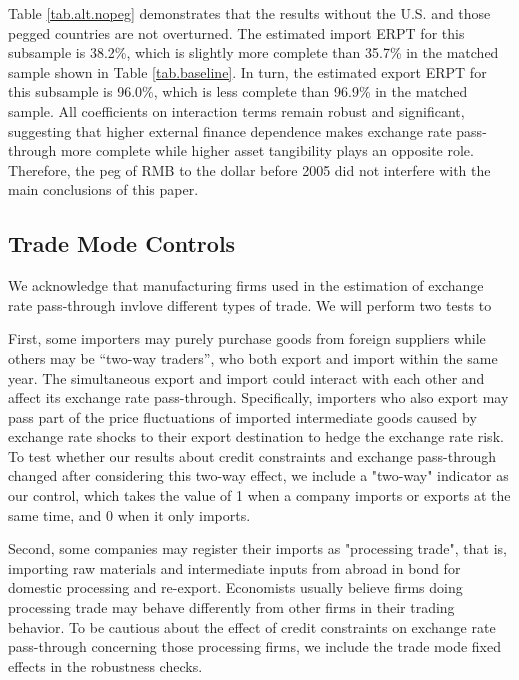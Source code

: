 \documentclass[12pt]{article}
\begin{document}
Table \ref{tab.alt.nopeg} demonstrates that the results without the U.S. and those pegged countries are not overturned. The estimated import ERPT for this subsample is 38.2\%, which is slightly more complete than 35.7\% in the matched sample shown in Table \ref{tab.baseline}. In turn, the estimated export ERPT for this subsample is 96.0\%, which is less complete than 96.9\% in the matched sample. All coefficients on interaction terms remain robust and significant, suggesting that higher external finance dependence makes exchange rate pass-through more complete while higher asset tangibility plays an opposite role. Therefore, the peg of RMB to the dollar before 2005 did not interfere with the main conclusions of this paper.

\subsection{Trade Mode Controls}

We acknowledge that manufacturing firms used in the estimation of exchange rate pass-through invlove different types of trade. We will perform two tests to

First, some importers may purely purchase goods from foreign suppliers while others may be ``two-way traders'', who both export and import within the same year. The simultaneous export and import could interact with each other and affect its exchange rate pass-through. Specifically, importers who also export may pass part of the price fluctuations of imported intermediate goods caused by exchange rate shocks to their export destination to hedge the exchange rate risk. To test whether our results about credit constraints and exchange pass-through changed after considering this two-way effect, we include a "two-way" indicator as our control, which takes the value of 1 when a company imports or exports at the same time, and 0 when it only imports.

Second, some companies may register their imports as "processing trade", that is, importing raw materials and intermediate inputs from abroad in bond for domestic processing and re-export. Economists usually believe firms doing processing trade may behave differently from other firms in their trading behavior. To be cautious about the effect of credit constraints on exchange rate pass-through concerning those processing firms, we include the trade mode fixed effects in the robustness checks.
\end{document}
